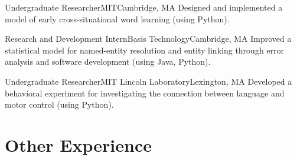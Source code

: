 \documentclass[11pt,letter]{moderncv}
\begin{document}
{Undergraduate Researcher}{MIT}{Cambridge, MA}{}{
%
Designed and implemented a model of early cross-situational word learning (using Python). %
%
}
\vspace*{0.2em}

\raggedright
{}
{Research and Development Intern}{Basis Technology}{Cambridge, MA}{}{
%
Improved a statistical model for named-entity resolution and entity linking through error analysis and software development (using Java, Python).
%
}
\vspace*{0.2em}

\raggedright
{}
{Undergraduate Researcher}{MIT Lincoln Laboratory}{Lexington, MA}{}{
%
Developed a behavioral experiment for investigating the connection between language and motor control (using Python).
%
}

%

\vspace*{0.25em}

\section{Other Experience}
\end{document}
